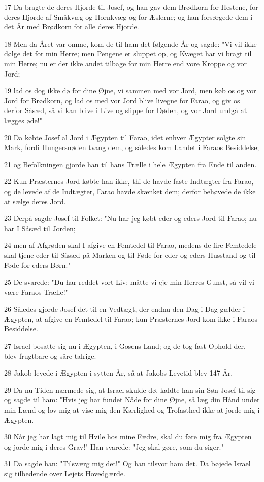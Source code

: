 \par 17 Da bragte de deres Hjorde til Josef, og han gav dem Brødkorn for Hestene, for deres Hjorde af Småkvæg og Hornkvæg og for Æslerne; og han forsørgede dem i det År med Brødkorn for alle deres Hjorde.
\par 18 Men da Året var omme, kom de til ham det følgende År og sagde: "Vi vil ikke dølge det for min Herre; men Pengene er sluppet op, og Kvæget har vi bragt til min Herre; nu er der ikke andet tilbage for min Herre end vore Kroppe og vor Jord;
\par 19 lad os dog ikke dø for dine Øjne, vi sammen med vor Jord, men køb os og vor Jord for Brødkorn, og lad os med vor Jord blive livegne for Farao, og giv os derfor Såsæd, så vi kan blive i Live og slippe for Døden, og vor Jord undgå at lægges øde!"
\par 20 Da købte Josef al Jord i Ægypten til Farao, idet enhver Ægypter solgte sin Mark, fordi Hungersnøden tvang dem, og således kom Landet i Faraos Besiddelse;
\par 21 og Befolkningen gjorde han til hans Trælle i hele Ægypten fra Ende til anden.
\par 22 Kun Præsternes Jord købte han ikke, thi de havde faste Indtægter fra Farao, og de levede af de Indtægter, Farao havde skænket dem; derfor behøvede de ikke at sælge deres Jord.
\par 23 Derpå sagde Josef til Folket: "Nu har jeg købt eder og eders Jord til Farao; nu har I Såsæd til Jorden;
\par 24 men af Afgrøden skal I afgive en Femtedel til Farao, medens de fire Femtedele skal tjene eder til Såsæd på Marken og til Føde for eder og eders Husstand og til Føde for eders Børn."
\par 25 De svarede: "Du har reddet vort Liv; måtte vi eje min Herres Gunst, så vil vi være Faraos Trælle!"
\par 26 Således gjorde Josef det til en Vedtægt, der endnu den Dag i Dag gælder i Ægypten, at afgive en Femtedel til Farao; kun Præsternes Jord kom ikke i Faraos Besiddelse.
\par 27 Israel bosatte sig nu i Ægypten, i Gosens Land; og de tog fast Ophold der, blev frugtbare og såre talrige.
\par 28 Jakob levede i Ægypten i sytten År, så at Jakobs Levetid blev 147 År.
\par 29 Da nu Tiden nærmede sig, at Israel skulde dø, kaldte han sin Søn Josef til sig og sagde til ham: "Hvis jeg har fundet Nåde for dine Øjne, så læg din Hånd under min Lænd og lov mig at vise mig den Kærlighed og Trofasthed ikke at jorde mig i Ægypten.
\par 30 Når jeg har lagt mig til Hvile hos mine Fædre, skal du føre mig fra Ægypten og jorde mig i deres Grav!" Han svarede: "Jeg skal gøre, som du siger."
\par 31 Da sagde han: "Tilsværg mig det!" Og han tilsvor ham det. Da bøjede Israel sig tilbedende over Lejets Hovedgærde.

